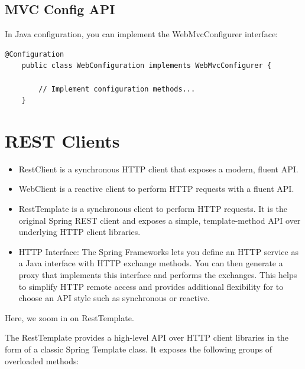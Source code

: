 \documentclass{scrartcl}
\begin{document}
\subsection{MVC Config API}

In Java configuration, you can implement the WebMvcConfigurer interface:

\begin{lstlisting}@Configuration
    public class WebConfiguration implements WebMvcConfigurer {

        // Implement configuration methods...
    }
\end{lstlisting}

\section{REST Clients}

\begin{itemize}
    \item RestClient is a synchronous HTTP client that exposes a modern, fluent API.
    \item WebClient is a reactive client to perform HTTP requests with a fluent API.
    \item RestTemplate is a synchronous client to perform HTTP requests. It is the original Spring REST client and exposes a simple, template-method API over underlying HTTP client libraries.
    \item HTTP Interface: The Spring Frameworks lets you define an HTTP service as a Java interface with HTTP exchange methods. You can then generate a proxy that implements this interface and performs the exchanges. This helps to simplify HTTP remote access and provides additional flexibility for to choose an API style such as synchronous or reactive.
\end{itemize}

Here, we zoom in on RestTemplate.

The RestTemplate provides a high-level API over HTTP client libraries in the form of a classic Spring Template class. It exposes the following groups of overloaded methods:
\end{document}

